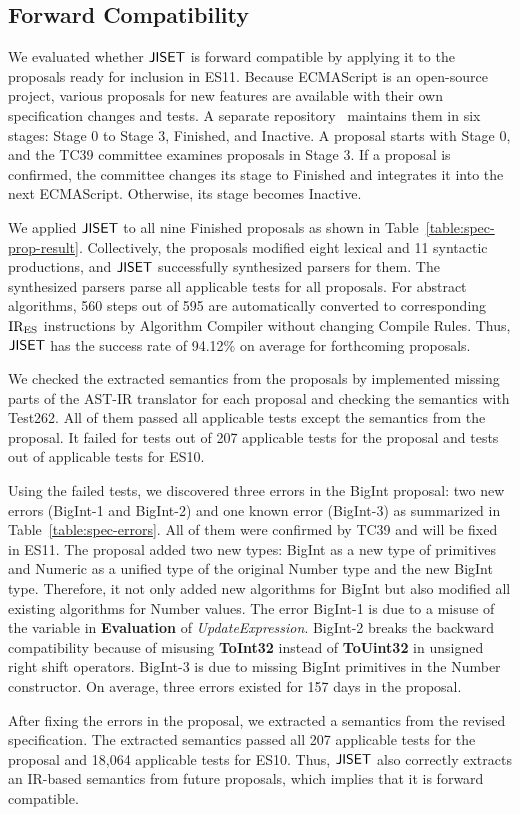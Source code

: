 \subsection{Forward Compatibility}
We evaluated whether \( \text{\sf JISET} \) is forward compatible by applying it
to the proposals ready for inclusion in ES11.  Because
ECMAScript is an open-source project, various proposals for new
features are available with their own specification changes and tests.
A separate repository~\cite{proposals} maintains them in six
stages: Stage 0 to Stage 3, Finished, and Inactive.  A proposal
starts with Stage 0, and the TC39 committee examines proposals in Stage 3.
If a proposal is confirmed, the committee changes
its stage to Finished and integrates it into the next ECMAScript.
Otherwise, its stage becomes Inactive.

We applied \( \text{\sf JISET} \) to all nine Finished proposals as shown in
Table~\ref{table:spec-prop-result}.
Collectively, the proposals modified eight lexical and
11 syntactic productions, and \( \text{\sf JISET} \) successfully
synthesized parsers for them.  The synthesized parsers parse all
applicable tests for all proposals.  For abstract algorithms,
560 steps out of 595 are automatically converted to
corresponding \( \text{IR}_\text{ES} \) instructions by \textsf{Algorithm Compiler}
without changing {\sf Compile Rules}.  Thus, \( \text{\sf JISET} \) has the
success rate of 94.12\% on average for forthcoming proposals.

We checked the extracted semantics from the proposals
by implemented missing parts of the AST-IR translator for
each proposal and checking the semantics with Test262.  All of them
passed all applicable tests except the semantics from the
 proposal.  It failed for  tests out of 207
applicable tests for the proposal and  tests out of
 applicable tests for ES10.

Using the failed tests, we discovered three errors in the
BigInt proposal: two new errors (BigInt-1 and BigInt-2) and one known
error (BigInt-3) as summarized in Table~\ref{table:spec-errors}.
All of them were confirmed by TC39 and will be fixed in ES11.
The proposal added two new types: BigInt as a new type of primitives
and Numeric as a unified type of the original Number type and the new BigInt type.
Therefore, it not only added new algorithms for BigInt but also modified
all existing algorithms for Number values.
The error BigInt-1 is due to a misuse of the variable
 in {\bf Evaluation} of {\it UpdateExpression}.
BigInt-2 breaks the backward compatibility because of
misusing {\bf ToInt32} instead of {\bf ToUint32}
in unsigned right shift operators.
BigInt-3 is due to missing BigInt primitives in the Number constructor.
On average, three errors existed for 157 days in the proposal.

After fixing the errors in the proposal, we extracted a semantics from
the revised specification.  The extracted semantics passed all 207
applicable tests for the proposal and 18,064 applicable tests
for ES10.  Thus, \( \text{\sf JISET} \) also correctly extracts an IR-based
semantics from future proposals, which implies that it is forward compatible.
